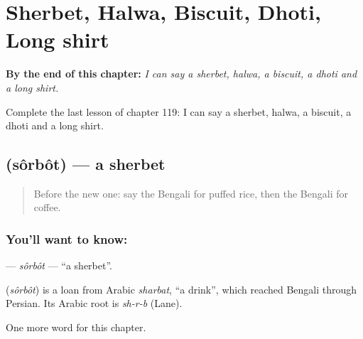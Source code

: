 
\chapter{Sherbet, Halwa, Biscuit, Dhoti, Long shirt}
\label{ch:bn-sherbet-halwa-biscuit-dhoti-long-shirt}

\begin{chapteropening}
\textbf{By the end of this chapter:} \emph{I can say a sherbet, halwa, a biscuit, a dhoti and a long shirt.}

Complete the last lesson of chapter 119: I can say a sherbet, halwa, a biscuit, a dhoti and a long shirt.
\end{chapteropening}

\section[\texorpdfstring{\bn{শরবত} (sôrbôt)}{শরবত (sôrbôt)}]{ (sôrbôt) — a sherbet}

\label{lesson:BN-C119-sorbot}



\begin{quote}
Before the new one: say the Bengali for puffed rice, then the Bengali for coffee.
\end{quote}

\subsection*{You'll want to know: }
\textbf{} — \emph{sôrbôt} — \textquotedblleft{}a sherbet\textquotedblright{}.

\begin{cousinweb}
\textbf{} (\emph{sôrbôt}) is a loan from Arabic \emph{sharbat}, \textquotedblleft{}a drink\textquotedblright{}, which reached Bengali through Persian. Its Arabic root is \emph{sh-r-b} (Lane).
\end{cousinweb}

\begin{grammarlens}[title={What you've built}]
One more word for this chapter.
\end{grammarlens}

